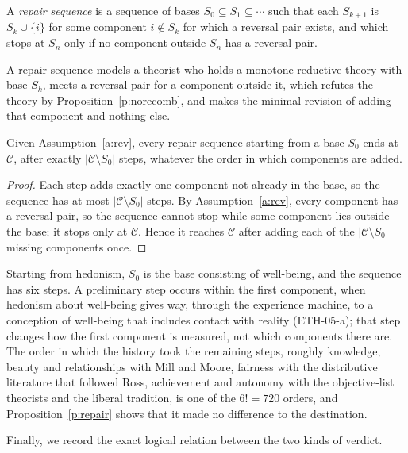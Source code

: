 \documentclass{situationist-preprint}
\begin{document}
\begin{definition}\label{d:repair}
A \emph{repair sequence} is a sequence of bases $S_0 \subseteq S_1 \subseteq \cdots$ such that each $S_{k+1}$ is $S_k \cup \{i\}$ for some component $i \notin S_k$ for which a reversal pair exists, and which stops at $S_n$ only if no component outside $S_n$ has a reversal pair.
\end{definition}

A repair sequence models a theorist who holds a monotone reductive theory with base $S_k$, meets a reversal pair for a component outside it, which refutes the theory by Proposition~\ref{p:norecomb}, and makes the minimal revision of adding that component and nothing else.

\begin{proposition}\label{p:repair}
Given Assumption~\ref{a:rev}, every repair sequence starting from a base $S_0$ ends at $\mathcal{C}$, after exactly $|\mathcal{C}\setminus S_0|$ steps, whatever the order in which components are added.
\end{proposition}

\begin{proof}
Each step adds exactly one component not already in the base, so the sequence has at most $|\mathcal{C}\setminus S_0|$ steps. By Assumption~\ref{a:rev}, every component has a reversal pair, so the sequence cannot stop while some component lies outside the base; it stops only at $\mathcal{C}$. Hence it reaches $\mathcal{C}$ after adding each of the $|\mathcal{C}\setminus S_0|$ missing components once.
\end{proof}

Starting from hedonism, $S_0$ is the base consisting of well-being, and the sequence has six steps. A preliminary step occurs within the first component, when hedonism about well-being gives way, through the experience machine, to a conception of well-being that includes contact with reality (ETH-05-a); that step changes how the first component is measured, not which components there are. The order in which the history took the remaining steps, roughly knowledge, beauty and relationships with Mill and Moore, fairness with the distributive literature that followed Ross, achievement and autonomy with the objective-list theorists and the liberal tradition, is one of the $6! = 720$ orders, and Proposition~\ref{p:repair} shows that it made no difference to the destination.

Finally, we record the exact logical relation between the two kinds of verdict.
\end{document}
